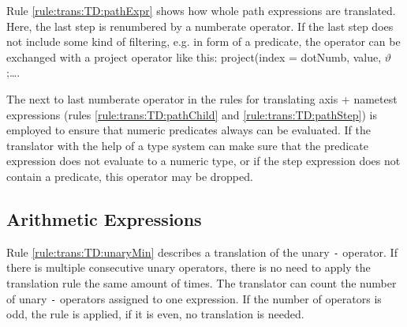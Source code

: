 Rule \ref{rule:trans:TD:pathExpr} shows how whole path expressions are translated. Here, the last step is
renumbered by a \textsf{numberate} operator. If the last step does not include some kind of filtering, e.g. in
form of a predicate, the operator can be exchanged with a \textsf{project} operator like this:
\textsf{project(index = dotNumb, value, }$\vartheta$\textsf{;\ldots}.

The next to last \textsf{numberate} operator in the rules for translating axis + nametest expressions (rules
\ref{rule:trans:TD:pathChild} and \ref{rule:trans:TD:pathStep}) is employed to ensure that numeric predicates
always can be evaluated. If the translator with the help of a type system can make sure that the predicate
expression does not evaluate to a numeric type, or if the step expression does not contain a predicate, this
operator may be dropped.

\subsection{Arithmetic Expressions}
\label{sect:trans:TD:simpl:arith}

Rule \ref{rule:trans:TD:unaryMin} describes a translation of the unary \texttt{-} operator. If there is multiple
consecutive unary operators, there is no need to apply the translation rule the same amount of times. The
translator can count the number of unary \texttt{-} operators assigned to one expression. If the number of
operators is odd, the rule is applied, if it is even, no translation is needed.

